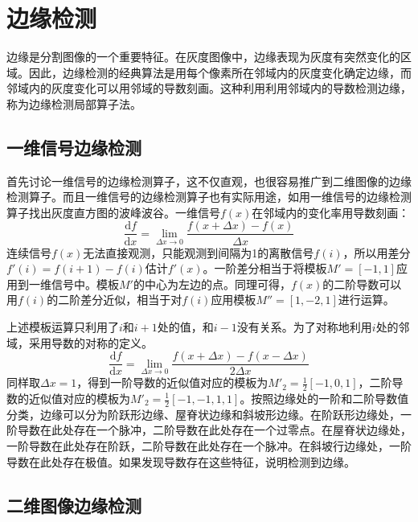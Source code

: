 \section{边缘检测}\label{sec:edge}

边缘是分割图像的一个重要特征。在灰度图像中，边缘表现为灰度有突然变化的区域。因此，边缘检测的经典算法是用每个像素所在邻域内的灰度变化确定边缘，而邻域内的灰度变化可以用邻域的导数刻画。这种利用利用邻域内的导数检测边缘，称为边缘检测局部算子法。

\subsection{一维信号边缘检测}

首先讨论一维信号的边缘检测算子，这不仅直观，也很容易推广到二维图像的边缘检测算子。而且一维信号的边缘检测算子也有实际用途，如用一维信号的边缘检测算子找出灰度直方图的波峰波谷。一维信号$f(x)$在邻域内的变化率用导数刻画：
\begin{equation}
  \label{eq:diff}
  \frac{\mathrm{d}f}{\mathrm{d}x}=\lim_{\Delta x\to 0}\frac{f(x+\Delta x)-f(x)}{\Delta x}
\end{equation}
连续信号$f(x)$无法直接观测，只能观测到间隔为1的离散信号$f(i)$，所以用差分$f'(i)=f(i+1)-f(i)$估计$f'(x)$。一阶差分相当于将模板$M'=[-1,1]$应用到一维信号中。模板$M'$的中心为左边的点。同理可得，$f(x)$的二阶导数可以用$f(i)$的二阶差分近似，相当于对$f(i)$应用模板$M''=[1,-2,1]$进行运算。

上述模板运算只利用了$i$和$i+1$处的值，和$i-1$没有关系。为了对称地利用$i$处的邻域，采用导数的对称的定义。
\begin{equation}
  \label{eq:diff2}
  \frac{\mathrm{d}f}{\mathrm{d}x}=\lim_{\Delta x\to 0}\frac{f(x+\Delta x)-f(x-\Delta x)}{2\Delta x}
\end{equation}
同样取$\Delta x=1$，得到一阶导数的近似值对应的模板为$M'_2=\frac{1}{2}[-1,0,1]$，二阶导数的近似值对应的模板为$M'_2=\frac{1}{2}[-1,-1,1,1]$。按照边缘处的一阶和二阶导数值分类，边缘可以分为阶跃形边缘、屋脊状边缘和斜坡形边缘。在阶跃形边缘处，一阶导数在此处存在一个脉冲，二阶导数在此处存在一个过零点。在屋脊状边缘处，一阶导数在此处存在阶跃，二阶导数在此处存在一个脉冲。在斜坡行边缘处，一阶导数在此处存在极值。如果发现导数存在这些特征，说明检测到边缘。

\subsection{二维图像边缘检测}

